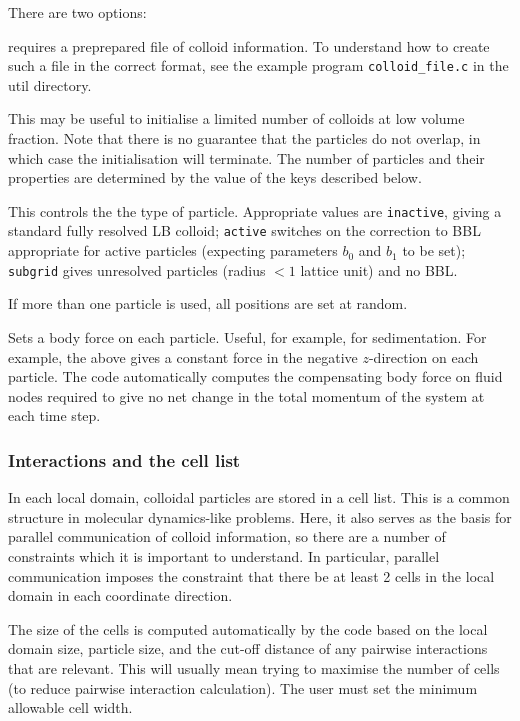 There are two options:


requires a preprepared file of colloid information. To understand
how to create such a file in the correct format,
see the example program \texttt{colloid\_file.c} in the util
directory.


This may be useful to initialise a limited number of colloids at
low volume fraction. Note that there is no guarantee that the
particles do not overlap, in which case the initialisation will
terminate. The number of particles and their properties
are determined by the value of the keys described below.


This controls the the type of particle. Appropriate values are
\texttt{inactive}, giving a standard fully resolved LB colloid;
\texttt{active} switches on the correction to BBL appropriate
for active particles (expecting parameters $b_0$ and $b_1$ to be
set); \texttt{subgrid} gives unresolved particles (radius $< 1$
lattice unit) and no BBL.

If more than one particle is used, all positions are set at random.



Sets a body force on each particle. Useful, for example, for
sedimentation. For example, the above gives a constant force in
the negative $z$-direction on each particle.
The code automatically computes the compensating body force on fluid
nodes required to give no net change in the total momentum of the
system at each time step.

\subsubsection{Interactions and the cell list}

In each local domain, colloidal particles are stored in a cell list.
This is a common structure in molecular dynamics-like problems. Here,
it also serves as the basis for parallel communication of colloid
information, so there are a number of constraints which it is important
to understand. In particular, parallel communication imposes the
constraint that there be at least 2 cells in the local domain in
each coordinate direction.

The size of the cells is computed automatically by the code based on
the local domain size, particle size, and the cut-off distance of any
pairwise interactions that are relevant. This will usually mean trying
to maximise the number of cells (to reduce pairwise interaction
calculation). The user must set the minimum allowable cell width.

